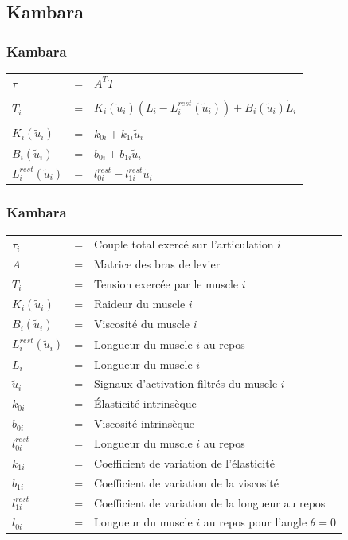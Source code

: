 \documentclass{beamer}
\begin{document}

\subsection{Kambara}

\begin{frame}
\frametitle{Kambara}
\begin{tabular}{lcl}
    $\tau$ & = & $A^T T$ \\
    \\
    $T_i$                     & = & $K_i(\tilde{u}_i) (L_i - L_i^{rest}(\tilde{u}_i)) + B_i(\tilde{u}_i) \dot{L}_i$ \\
    \\
    $K_i(\tilde{u}_i)$        & = & $k_{0i} + k_{1i} \tilde{u}_i$ \\
    $B_i(\tilde{u}_i)$        & = & $b_{0i} + b_{1i} \tilde{u}_i$ \\
    $L_i^{rest}(\tilde{u}_i)$ & = & $ l_{0i}^{rest} - l_{1i}^{rest} \tilde{u}_i$ \\
\end{tabular}
\end{frame}

\begin{frame}
\frametitle{Kambara}
\begin{tabular}{lcl}
    $\tau_i$ & = & Couple total exercé sur l'articulation $i$ \\
    $A$  & = & Matrice des bras de levier \\
    $T_i$  & = & Tension exercée par le muscle $i$ \\
    $K_i(\tilde{u}_i)$ & = & Raideur du muscle $i$ \\
    $B_i(\tilde{u}_i)$ & = & Viscosité du muscle $i$ \\
    $L_i^{rest}(\tilde{u}_i)$ & = & Longueur du muscle $i$ au repos \\
    $L_i$ & = & Longueur du muscle $i$ \\
    $\tilde{u}_i$ & = & Signaux d'activation filtrés du muscle $i$ \\
    $k_{0i}$ & = & Élasticité intrinsèque \\
    $b_{0i}$ & = & Viscosité intrinsèque \\
    $l^{rest}_{0i}$ & = & Longueur du muscle $i$ au repos \\
    $k_{1i}$ & = & Coefficient de variation de l'élasticité \\
    $b_{1i}$ & = & Coefficient de variation de la viscosité \\
    $l^{rest}_{1i}$ & = & Coefficient de variation de la longueur au repos \\
    $l_{0i}$ & = & Longueur du muscle $i$ au repos pour l'angle $\theta = 0$ \\
\end{tabular}
\end{frame}
\end{document}
